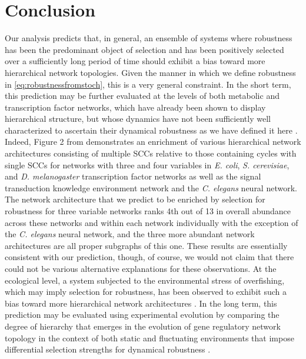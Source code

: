 \section{Conclusion}
Our analysis predicts that, in general, an ensemble of systems where robustness has been the predominant object of selection and has been positively selected over a sufficiently long period of time should exhibit a bias toward more hierarchical network topologies. Given the manner in which we define robustness in \ref{eq:robustnessfromstoch}, this is a very general constraint. In the short term, this prediction may be further evaluated at the levels of both metabolic and transcription factor networks, which have already been shown to display hierarchical structure, but whose dynamics have not been sufficiently well characterized to ascertain their dynamical robustness as we have defined it here \cite{Zhao2006,Bhardwaj2010,Colm,Prill2005}. Indeed, Figure 2 from \cite{Prill2005} demonstrates an enrichment of various hierarchical network architectures consisting of multiple SCCs relative to those containing cycles with single SCCs for networks with three and four variables in \emph{E. coli}, \emph{S. cerevisiae}, and \emph{D. melanogaster} transcription factor networks as well as the signal transduction knowledge environment network and the \emph{C. elegans} neural network. The network architecture that we predict to be enriched by selection for robustness for three variable networks ranks 4th out of 13 in overall abundance across these networks and within each network individually with the exception of the \emph{C. elegans} neural network, and the three more abundant network architectures are all proper subgraphs of this one. These results are essentially consistent with our prediction, though, of course, we would not claim that there could not be various alternative explanations for these observations. At the ecological level, a system subjected to the environmental stress of overfishing, which may imply selection for robustness, has been observed to exhibit such a bias toward more hierarchical network architectures \cite{Bascompte2005}.
In the long term, this prediction may be evaluated using experimental evolution by comparing the degree of hierarchy that emerges in the evolution of gene regulatory network topology in the context of both static and fluctuating environments that impose differential selection strengths for dynamical robustness \cite{Leroi1994}.

